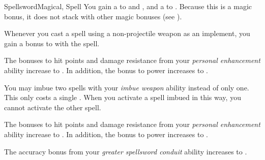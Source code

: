 \begin{feat}{Spellsword}{Magical, Spell}
         You gain a   to  and , and a   to .
        Because this is a magic bonus, it does not stack with other magic bonuses (see ).

         Whenever you cast a spell using a non-projectile weapon as an implement, you gain a  bonus to  with the spell.

         The bonuses to hit points and damage resistance from your \textit{personal enhancement} ability increase to .
        In addition, the bonus to power increases to .

         You may imbue two spells with your \textit{imbue weapon} ability instead of only one.
        This only costs a single .
        When you activate a spell imbued in this way, you  cannot activate the other spell.

         The bonuses to hit points and damage resistance from your \textit{personal enhancement} ability increase to .
        In addition, the bonus to power increases to .

         The accuracy bonus from your \textit{greater spellsword conduit} ability increases to .
    \end{feat}

